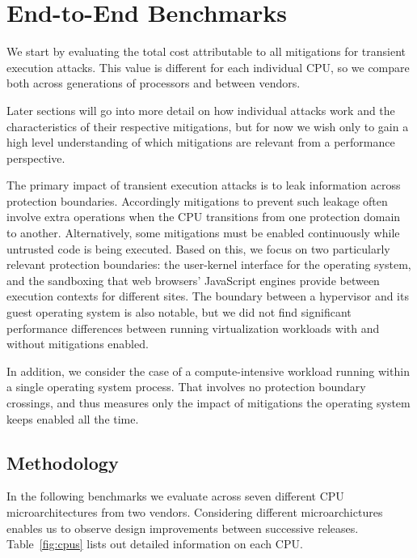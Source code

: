 \section{End-to-End Benchmarks}
\label{s:benchmarks}

We start by evaluating the total cost attributable to all mitigations for transient execution attacks.
This value is different for each individual CPU, so we compare both across generations of processors and between vendors.

Later sections will go into more detail on how individual attacks work and the characteristics of their respective mitigations, but for now we wish only to gain a high level understanding of which mitigations are relevant from a performance perspective.

The primary impact of transient execution attacks is to leak information across protection boundaries.
Accordingly mitigations to prevent such leakage often involve extra operations when the CPU transitions from one protection domain to another.
Alternatively, some mitigations must be enabled continuously while untrusted code is being executed.
Based on this, we focus on two particularly relevant protection boundaries: the user-kernel interface for the operating system, and the sandboxing that web browsers' JavaScript engines provide between execution contexts for different sites.
The boundary between a hypervisor and its guest operating system is also notable, but we did not find significant performance differences between running virtualization workloads with and without mitigations enabled.

In addition, we consider the case of a compute-intensive workload running within a single operating system process.
That involves no protection boundary crossings, and thus measures only the impact of mitigations the operating system keeps enabled all the time.

\subsection{Methodology}
In the following benchmarks we evaluate across seven different CPU microarchitectures from two vendors.
Considering different microarchictures enables us to observe design improvements between successive releases.
Table~\ref{fig:cpus} lists out detailed information on each CPU.

